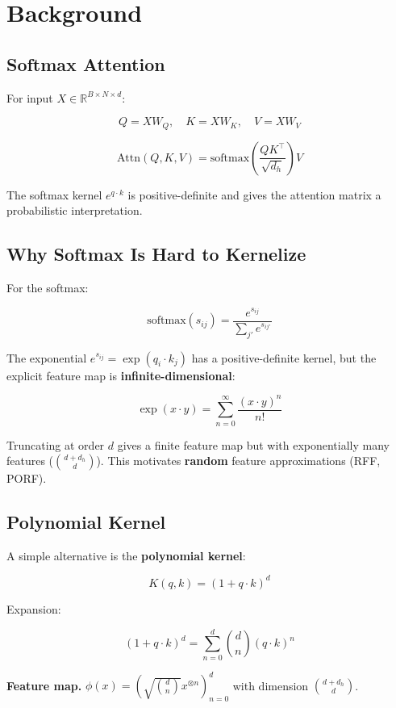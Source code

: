 \section{Background}

\subsection{Softmax Attention}

For input $X \in \mathbb{R}^{B \times N \times d}$:

\[
Q = X W_Q, \quad K = X W_K, \quad V = X W_V
\tag{3.1}
\]

\[
\text{Attn}(Q, K, V) = \text{softmax}\!\left(\frac{Q K^\top}{\sqrt{d_h}}\right) V
\tag{3.2}
\]

The softmax kernel $e^{q \cdot k}$ is positive-definite and gives the 
attention matrix a probabilistic interpretation.

\subsection{Why Softmax Is Hard to Kernelize}

For the softmax:

\[
\text{softmax}(s_{ij}) = \frac{e^{s_{ij}}}{\sum_{j'} e^{s_{ij'}}}
\tag{3.3}
\]

The exponential $e^{s_{ij}} = \exp(q_i \cdot k_j)$ has a positive-definite 
kernel, but the explicit feature map is \textbf{infinite-dimensional}:

\[
\exp(x \cdot y) = \sum_{n=0}^\infty \frac{(x \cdot y)^n}{n!}
\tag{3.4}
\]

Truncating at order $d$ gives a finite feature map but with exponentially 
many features ($\binom{d + d_h}{d}$). This motivates \textbf{random} feature 
approximations (RFF, PORF).

\subsection{Polynomial Kernel}

A simple alternative is the \textbf{polynomial kernel}:

\[
K(q, k) = (1 + q \cdot k)^d
\tag{3.5}
\]

Expansion:

\[
(1 + q \cdot k)^d = \sum_{n=0}^d \binom{d}{n} (q \cdot k)^n
\tag{3.6}
\]

\textbf{Feature map.} $\phi(x) = \left( \sqrt{\binom{d}{n}} x^{\otimes n} \right)_{n=0}^d$ with dimension 
$\binom{d + d_h}{d}$.

